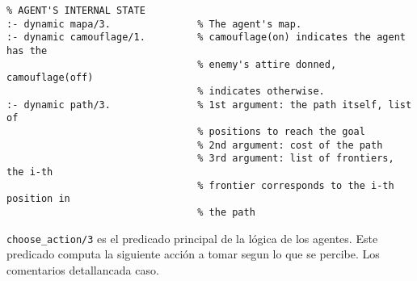 \documentclass[a4paper,12pt]{report}
\begin{document}
\begin{verbatim}
% AGENT'S INTERNAL STATE
:- dynamic mapa/3.               % The agent's map.
:- dynamic camouflage/1.         % camouflage(on) indicates the agent has the
                                 % enemy's attire donned, camouflage(off)
                                 % indicates otherwise.
:- dynamic path/3.               % 1st argument: the path itself, list of
                                 % positions to reach the goal
                                 % 2nd argument: cost of the path
                                 % 3rd argument: list of frontiers, the i-th
                                 % frontier corresponds to the i-th position in
                                 % the path

\end{verbatim}

\texttt{choose\_action/3} es el predicado principal de la l\'{o}gica de los agentes.
Este predicado computa la siguiente acci\'{o}n a tomar segun lo que se percibe.
Los comentarios detallancada caso.
\end{document}
